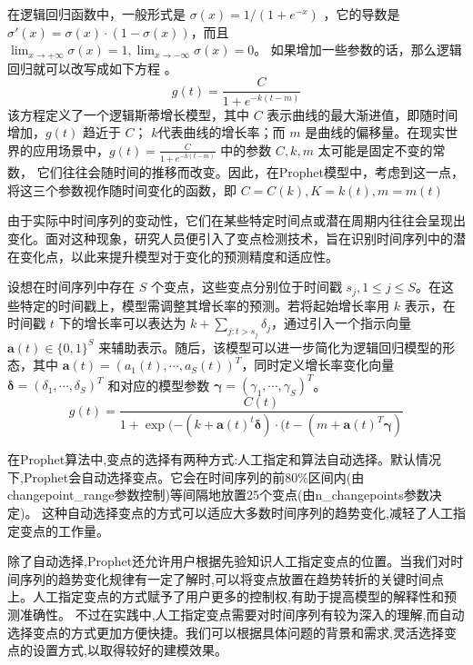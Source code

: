 在逻辑回归函数中，一般形式是 $\sigma(x) = 1/(1+e^{-x})$ ，它的导数是 $\sigma'(x) = \sigma(x) \cdot(1-\sigma(x))$，而且$\lim_{x\rightarrow +\infty} \sigma(x) = 1, \lim_{x\rightarrow -\infty} \sigma(x) = 0$。
如果增加一些参数的话，那么逻辑回归就可以改写成如下方程\cite{李威2021Prophet模型在GNSS坐标时间序列中的插值分析} 。
\begin{equation}
	g(t) = \frac{C}{1 + e^{-k(t - m)}}
\end{equation}
该方程定义了一个逻辑斯蒂增长模型，其中 $C$ 表示曲线的最大渐进值，即随时间增加，$g(t)$ 趋近于 $C$；
$k$代表曲线的增长率；而 $m$ 是曲线的偏移量。在现实世界的应用场景中，$g(t) = \frac{C}{1 + e^{-k(t - m)}}$ 中的参数 $C, k, m$ 太可能是固定不变的常数，
它们往往会随时间的推移而改变。因此，在Prophet模型中，考虑到这一点，将这三个参数视作随时间变化的函数，即 $ C = C(k), K = k(t), m = m(t)$

由于实际中时间序列的变动性，它们在某些特定时间点或潜在周期内往往会呈现出变化。面对这种现象，研究人员便引入了变点检测技术，旨在识别时间序列中的潜在变化点，以此来提升模型对于变化的预测精度和适应性。

设想在时间序列中存在 $S$ 个变点，这些变点分别位于时间戳 $s_{j}, 1\leq j\leq S$。在这些特定的时间戳上，模型需调整其增长率的预测。若将起始增长率用 $k$ 表示，在时间戳 $t$ 下的增长率可以表达为 $k + \sum_{j:t>s_{j}} \delta_{j}$，通过引入一个指示向量 $\mathbf{a}(t)\in \{0,1\}^{S}$ 来辅助表示。随后，该模型可以进一步简化为逻辑回归模型的形态，其中 $\mathbf{a}(t) = (a_{1}(t),\cdots,a_{S}(t))^{T}$，同时定义增长率变化向量 $\mathbf{\delta} = (\delta_{1},\cdots,\delta_{S})^{T}$ 和对应的模型参数 $\mathbf{\gamma} = (\gamma_{1},\cdots,\gamma_{S})^{T}$。
\begin{equation}
	g(t) = \frac{C(t)}{1+\exp(-(k+\mathbf{a}(t)^{t}\mathbf{\delta}) \cdot (t - (m+\mathbf{a}(t)^{T}\mathbf{\gamma})}
\end{equation}

在Prophet算法中,变点的选择有两种方式:人工指定和算法自动选择。默认情况下,Prophet会自动选择变点。它会在时间序列的前80\%区间内(由changepoint\_range参数控制)等间隔地放置25个变点(由n\_changepoints参数决定)。
这种自动选择变点的方式可以适应大多数时间序列的趋势变化,减轻了人工指定变点的工作量。

除了自动选择,Prophet还允许用户根据先验知识人工指定变点的位置。当我们对时间序列的趋势变化规律有一定了解时,可以将变点放置在趋势转折的关键时间点上。人工指定变点的方式赋予了用户更多的控制权,有助于提高模型的解释性和预测准确性。
不过在实践中,人工指定变点需要对时间序列有较为深入的理解,而自动选择变点的方式更加方便快捷。我们可以根据具体问题的背景和需求,灵活选择变点的设置方式,以取得较好的建模效果。

